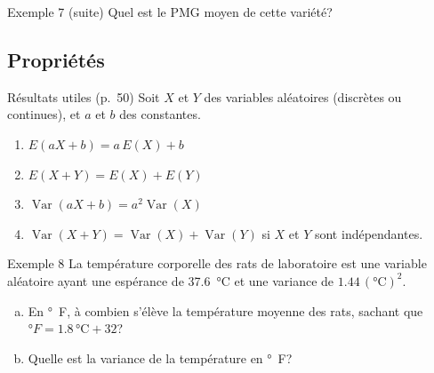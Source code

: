 \documentclass{BeamerTemplate}
\begin{document}
\begin{frame}[t]{Exemple 7 (suite)}
  Quel est le PMG moyen de cette variété?
\end{frame}

\subsection{Propriétés}

\begin{frame}[t]{Résultats utiles (p.~50)}
  Soit $X$ et $Y$ des variables aléatoires (discrètes ou continues), et $a$ et
  $b$ des constantes.

  \begin{prp}
    \begin{enumerate}\itemsep 2mm
      \item $E(aX + b) = a\,E(X) + b$
      \item $E(X + Y) = E(X) + E(Y)$
      \item $\operatorname{Var}(aX + b) = a^2 \operatorname{Var}(X)$
      \item $\operatorname{Var}(X + Y) = \operatorname{Var}(X) + \operatorname{Var}(Y)$
        si $X$ et $Y$ sont \alert{indépendantes}.
    \end{enumerate}
  \end{prp}

\end{frame}

\begin{frame}[t]{Exemple 8}
  La température corporelle des rats de laboratoire est une variable aléatoire
  ayant une espérance de \SI{37.6}{\celsius} et une variance de
  $1.44\,(\si{\celsius})^2$.

  \begin{enumerate}[a)]\itemsep 2.2cm
    \item En \si{\degree F}, à combien s'élève la température moyenne des rats,
      sachant que $\si{\degree F} = 1.8\,\si{\celsius} + 32$?
    \item Quelle est la variance de la température en \si{\degree F}?
  \end{enumerate}
\end{frame}
\end{document}
